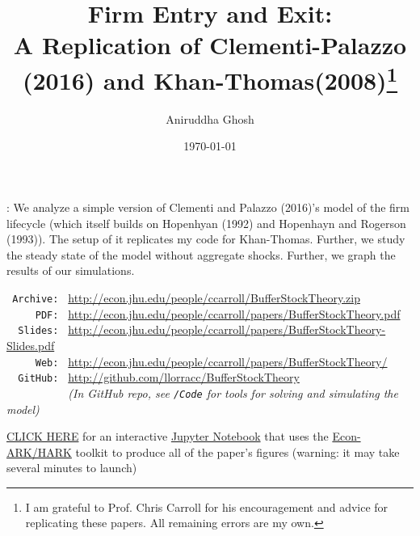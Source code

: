 \documentclass[]{article}
\newcommand{\fn}{\footnote}
\begin{document}
\begin{titlepage}
\def\thefootnote{\fnsymbol{footnote}}
\vspace*{1.1in}
\title{Firm Entry and Exit: \\   \vspace{0.5em}
A Replication of Clementi-Palazzo (2016) and Khan-Thomas(2008)\fn{I am grateful to Prof. Chris Carroll for his encouragement and advice for replicating these papers. All remaining errors are my own.}}
\author{Aniruddha Ghosh}
\date{\today}

\end{titlepage}

\linespread{2}
\maketitle


: We analyze a simple version of Clementi and Palazzo (2016)’s \cite{cp16} model of the firm lifecycle (which
itself builds on Hopenhyan (1992) and Hopenhayn and Rogerson (1993)). The setup of it
replicates my code for Khan-Thomas. Further, we study the steady state of the model without aggregate
shocks. Further, we graph the results of our simulations.
    \hspace*{2.0em} 



\begin{small}
\parbox{\textwidth}{
\begin{center}
\begin{tabbing}
\texttt{~Archive:~} \= \= \url{http://econ.jhu.edu/people/ccarroll/BufferStockTheory.zip} \kill \\  %
\texttt{~~~~~PDF:~} \> \> \url{http://econ.jhu.edu/people/ccarroll/papers/BufferStockTheory.pdf} \\
\texttt{~~Slides:~} \> \> \url{http://econ.jhu.edu/people/ccarroll/papers/BufferStockTheory-Slides.pdf} \\
\texttt{~~~~~Web:~} \> \> \url{http://econ.jhu.edu/people/ccarroll/papers/BufferStockTheory/}    \\
\texttt{~~GitHub:~} \> \> \url{http://github.com/llorracc/BufferStockTheory} \\
\texttt{~~~~~~~~~~} \> \> \textit{(In GitHub repo, see \texttt{/Code} for tools for solving and simulating the model)} \\
\end{tabbing}
\end{center}
          
\href{https://colab.research.google.com/github/llorracc/BufferStockTheory/blob/master/Code/Python/BufferStockTheory.ipynb}{CLICK HERE} for an interactive \href{https://en.wikipedia.org/wiki/Project\_Jupyter\#Jupyter_Notebook}{Jupyter Notebook} that uses the \href{https://econ-ark/HARK}{Econ-ARK/HARK} toolkit to produce all of the paper's figures (warning: it may take several minutes to launch)}
\end{small}
\end{document}
